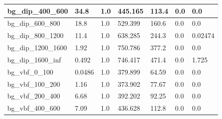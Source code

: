 \documentclass[a4paper, 10pt]{article}
\begin{document}
\begin{table}[H]
\begin{center}
\begin{tabular}{|m{23.0mm}|m{23.0mm}|m{18.0mm}|m{19.0mm}|m{19.0mm}|m{19.0mm}|m{19.0mm}|}
      \hline
      {\cellcolor{white}         bg\_dip\_400\_600}& {\cellcolor{white}         34.8}& {\cellcolor{white}         1.0}& {\cellcolor{white}         445.165}& {\cellcolor{white}         113.4}& {\cellcolor{green}         0.0}& {\cellcolor{green}         0.0}\\
      \hline
      {\cellcolor{white}         bg\_dip\_600\_800}& {\cellcolor{white}         18.8}& {\cellcolor{white}         1.0}& {\cellcolor{white}         529.399}& {\cellcolor{white}         160.6}& {\cellcolor{green}         0.0}& {\cellcolor{green}         0.0}\\
      \hline
      {\cellcolor{white}         bg\_dip\_800\_1200}& {\cellcolor{white}         11.4}& {\cellcolor{white}         1.0}& {\cellcolor{white}         638.285}& {\cellcolor{white}         244.3}& {\cellcolor{green}         0.0}& {\cellcolor{green}         0.02474}\\
      \hline
      {\cellcolor{white}         bg\_dip\_1200\_1600}& {\cellcolor{white}         1.92}& {\cellcolor{white}         1.0}& {\cellcolor{white}         750.786}& {\cellcolor{white}         377.2}& {\cellcolor{green}         0.0}& {\cellcolor{green}         0.0}\\
      \hline
      {\cellcolor{white}         bg\_dip\_1600\_inf}& {\cellcolor{white}         0.492}& {\cellcolor{white}         1.0}& {\cellcolor{white}         746.417}& {\cellcolor{white}         471.4}& {\cellcolor{green}         0.0}& {\cellcolor{green}         1.725}\\
      \hline
      {\cellcolor{white}         bg\_vbf\_0\_100}& {\cellcolor{white}         0.0486}& {\cellcolor{white}         1.0}& {\cellcolor{white}         379.899}& {\cellcolor{white}         64.59}& {\cellcolor{green}         0.0}& {\cellcolor{green}         0.0}\\
      \hline
      {\cellcolor{white}         bg\_vbf\_100\_200}& {\cellcolor{white}         1.16}& {\cellcolor{white}         1.0}& {\cellcolor{white}         373.902}& {\cellcolor{white}         77.67}& {\cellcolor{green}         0.0}& {\cellcolor{green}         0.0}\\
      \hline
      {\cellcolor{white}         bg\_vbf\_200\_400}& {\cellcolor{white}         6.68}& {\cellcolor{white}         1.0}& {\cellcolor{white}         392.202}& {\cellcolor{white}         92.25}& {\cellcolor{green}         0.0}& {\cellcolor{green}         0.0}\\
      \hline
      {\cellcolor{white}         bg\_vbf\_400\_600}& {\cellcolor{white}         7.09}& {\cellcolor{white}         1.0}& {\cellcolor{white}         436.628}& {\cellcolor{white}         112.8}& {\cellcolor{green}         0.0}& {\cellcolor{green}         0.0}\\

\end{tabular}
\end{center}
\end{table}
\end{document}
